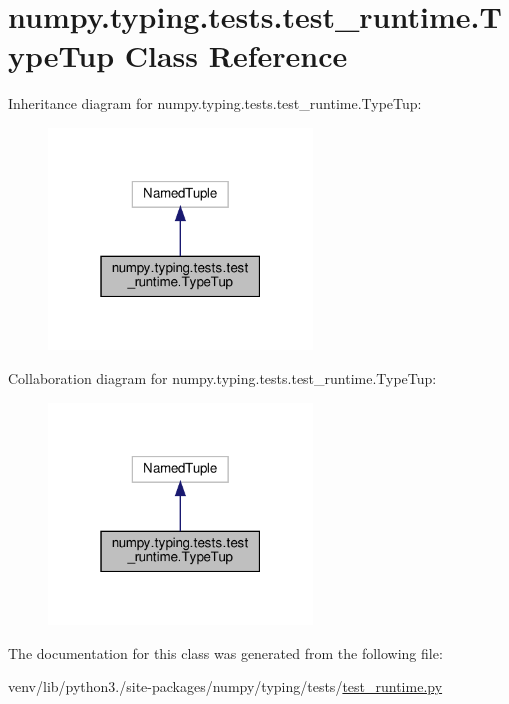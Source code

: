 \hypertarget{classnumpy_1_1typing_1_1tests_1_1test__runtime_1_1TypeTup}{}\section{numpy.\+typing.\+tests.\+test\+\_\+runtime.\+Type\+Tup Class Reference}
\label{classnumpy_1_1typing_1_1tests_1_1test__runtime_1_1TypeTup}


Inheritance diagram for numpy.\+typing.\+tests.\+test\+\_\+runtime.\+Type\+Tup\+:
\nopagebreak
\begin{figure}[H]
\begin{center}
\leavevmode
\includegraphics[width=199pt]{classnumpy_1_1typing_1_1tests_1_1test__runtime_1_1TypeTup__inherit__graph}
\end{center}
\end{figure}


Collaboration diagram for numpy.\+typing.\+tests.\+test\+\_\+runtime.\+Type\+Tup\+:
\nopagebreak
\begin{figure}[H]
\begin{center}
\leavevmode
\includegraphics[width=199pt]{classnumpy_1_1typing_1_1tests_1_1test__runtime_1_1TypeTup__coll__graph}
\end{center}
\end{figure}


The documentation for this class was generated from the following file\+:\begin{DoxyCompactItemize}
\item 
venv/lib/python3./site-\/packages/numpy/typing/tests/\hyperlink{test__runtime_8py}{test\+\_\+runtime.\+py}\end{DoxyCompactItemize}
